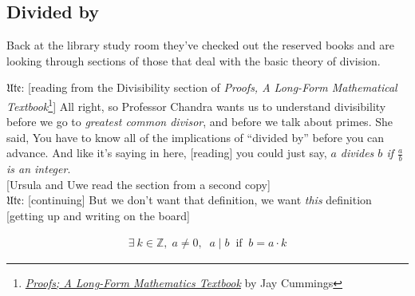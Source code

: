 \documentclass[american]{article}
\begin{document}
\subsection*{Divided by}
\label{sec:orgce0892d}
Back at the library study room they've checked out the reserved books
and are looking through sections of those that deal with the basic
theory of division.

𝔘𝔱𝔢: [reading from the
Divisibility section of \emph{Proofs, A Long-Form Mathematical
Textbook}\footnote{\emph{\href{https://longformmath.com/proofs-home}{Proofs; A Long-Form Mathematics Textbook}} by Jay Cummings}] All right, so Professor Chandra wants us to
understand divisibility before we go to \emph{greatest common divisor}, and
before we talk about primes. She said, You have to know all of the
implications of ``divided by'' before you can advance. And like it's
saying in here, [reading] you could just say, \emph{\(a\) divides \(b\) if
\(\frac{a}{b}\) is an integer}. \\[0pt]
[Ursula and Uwe read the section from a second copy] \\[0pt]
𝔘𝔱𝔢: [continuing] But
we don't want that definition, we want \emph{this} definition [getting up
and writing on the board]

\begin{align}
\exists \: k \in \mathbb{Z},\; a \neq 0, \;\;a \mid b \;\; \text{if} \;\; b = a \cdot k  
\end{align}
\end{document}
